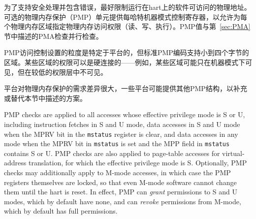 {\iffalse
To support secure processing and contain faults, it is desirable to
limit the physical addresses accessible by software running on a hart.
An optional physical memory protection (PMP) unit provides
per-hart machine-mode control registers to allow
physical memory access privileges (read, write, execute) to be
specified for each physical memory region.  The PMP values are checked
in parallel with the PMA checks described in Section~\ref{sec:pma}.
\fi
为了支持安全处理并包含错误，最好限制运行在hart上的软件可访问的物理地址。
可选的物理内存保护（PMP）单元提供每哈特机器模式控制寄存器，以允许为每个物理内存区域指定物理内存访问权限（读、写、执行）。PMP值与第~\ref{sec:PMA}节中描述的PMA检查并行检查。

\iffalse
The granularity of PMP access control settings are platform-specific,
but the standard PMP
encoding supports regions as small as four bytes.  Certain regions' privileges
can be hardwired---for example, some regions might only ever be visible in
machine mode but in no lower-privilege layers.
\fi
PMP访问控制设置的粒度是特定于平台的，但标准PMP编码支持小到四个字节的区域。某些区域的权限可以是硬连接的——例如，某些区域可能只在机器模式下可见，但在较低的权限层中不可见。

\iffalse
\begin{commentary}
Platforms vary widely in demands for physical memory protection, and
some platforms may provide other PMP structures in addition to or
instead of the scheme described in this section.
\end{commentary}
\fi
\begin{commentary}
平台对物理内存保护的需求差异很大，一些平台可能提供其他PMP结构，以补充或替代本节中描述的方案。
\end{commentary}

\iffalse
PMP checks are applied to all accesses whose effective privilege mode is S or
U, including instruction fetches in S and U mode, data accesses in S and
U mode when the MPRV bit in the {\tt mstatus} register is clear, and data
accesses in any mode when the MPRV bit in {\tt mstatus} is set and the MPP
field in {\tt mstatus} contains S or U.
PMP checks are also applied to page-table
accesses for virtual-address translation, for which the effective
privilege mode is S.  Optionally, PMP checks may additionally apply
to M-mode accesses, in which case the PMP registers themselves are
locked, so that even M-mode software cannot change them until the hart is
reset.  In effect, PMP can {\em grant} permissions to S and U
modes, which by default have none, and can {\em revoke} permissions
from M-mode, which by default has full permissions.

}
